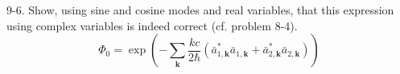 \documentclass[12pt]{article}
\begin{document}
9-6.
Show, using sine and cosine modes and real variables,
that this expression using complex variables is indeed
correct (cf. problem 8-4).
\begin{equation*}
\Phi_0=\exp\left(
-\sum_{\mathbf k}
\frac{kc}{2\hbar}
\left(
\bar a_{1,\mathbf k}^*
\bar a_{1,\mathbf k}
+
\bar a_{2,\mathbf k}^*
\bar a_{2,\mathbf k}
\right)
\right)
\tag{9.43}
\end{equation*}
\end{document}

